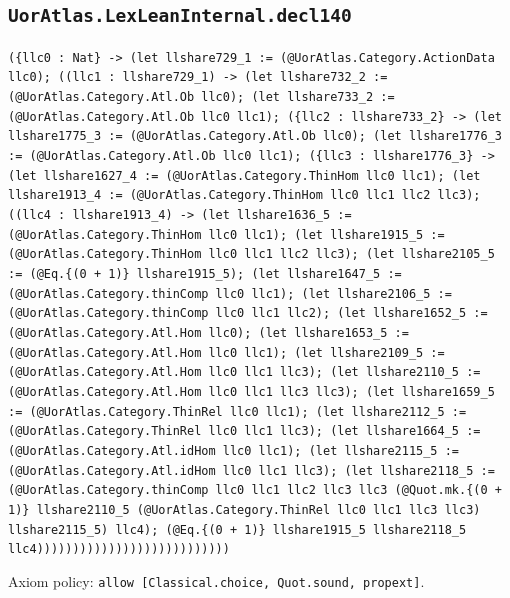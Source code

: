\documentclass[11pt]{article}
\begin{document}
\subsection*{\texttt{UorAtlas.LexLeanInternal.decl140}}
\noindent\texttt{(\{llc0 : Nat\} -> (let llshare729\_1 := (@UorAtlas.Category.ActionData llc0); ((llc1 : llshare729\_1) -> (let llshare732\_2 := (@UorAtlas.Category.Atl.Ob llc0); (let llshare733\_2 := (@UorAtlas.Category.Atl.Ob llc0 llc1); (\{llc2 : llshare733\_2\} -> (let llshare1775\_3 := (@UorAtlas.Category.Atl.Ob llc0); (let llshare1776\_3 := (@UorAtlas.Category.Atl.Ob llc0 llc1); (\{llc3 : llshare1776\_3\} -> (let llshare1627\_4 := (@UorAtlas.Category.ThinHom llc0 llc1); (let llshare1913\_4 := (@UorAtlas.Category.ThinHom llc0 llc1 llc2 llc3); ((llc4 : llshare1913\_4) -> (let llshare1636\_5 := (@UorAtlas.Category.ThinHom llc0 llc1); (let llshare1915\_5 := (@UorAtlas.Category.ThinHom llc0 llc1 llc2 llc3); (let llshare2105\_5 := (@Eq.\{(0 + 1)\} llshare1915\_5); (let llshare1647\_5 := (@UorAtlas.Category.thinComp llc0 llc1); (let llshare2106\_5 := (@UorAtlas.Category.thinComp llc0 llc1 llc2); (let llshare1652\_5 := (@UorAtlas.Category.Atl.Hom llc0); (let llshare1653\_5 := (@UorAtlas.Category.Atl.Hom llc0 llc1); (let llshare2109\_5 := (@UorAtlas.Category.Atl.Hom llc0 llc1 llc3); (let llshare2110\_5 := (@UorAtlas.Category.Atl.Hom llc0 llc1 llc3 llc3); (let llshare1659\_5 := (@UorAtlas.Category.ThinRel llc0 llc1); (let llshare2112\_5 := (@UorAtlas.Category.ThinRel llc0 llc1 llc3); (let llshare1664\_5 := (@UorAtlas.Category.Atl.idHom llc0 llc1); (let llshare2115\_5 := (@UorAtlas.Category.Atl.idHom llc0 llc1 llc3); (let llshare2118\_5 := (@UorAtlas.Category.thinComp llc0 llc1 llc2 llc3 llc3 (@Quot.mk.\{(0 + 1)\} llshare2110\_5 (@UorAtlas.Category.ThinRel llc0 llc1 llc3 llc3) llshare2115\_5) llc4); (@Eq.\{(0 + 1)\} llshare1915\_5 llshare2118\_5 llc4)))))))))))))))))))))))))))}\par
\noindent Axiom policy: \texttt{allow [Classical.choice, Quot.sound, propext]}.\par
\end{document}
